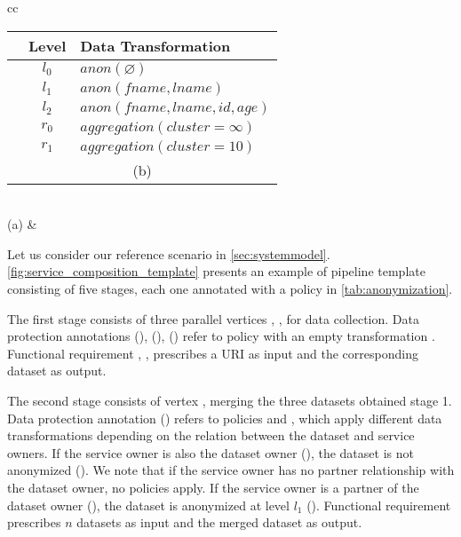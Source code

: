 \begin{table*}[ht!]
{\begin{tabular}[t]{cc}
      \begin{tabular}[t]{c|c|l}
        \textbf{\tp{i}} & \textbf{Level} & \textbf{Data Transformation}                      \\\hline
        \tp{0}          & $l_0$          & $anon(\varnothing)$                               \\
        \tp{1}          & $l_1$          & $anon(fname, lname)$                              \\
        \tp{2}          & $l_2$          & $anon(fname, lname, id, age)$                     \\
        \tp{3}          & $r_0$          & $aggregation(cluster=\infty)                    $ \\
        \tp{4}          & $r_1$          & $aggregation(cluster=10)                       $  \\
        \multicolumn{3}{c}{\footnotesize (b)}
      \end{tabular} \\
      \footnotesize (a) &                                                                                          \\
    \end{tabular}
  }
\end{table*}
Let us consider our reference scenario in \cref{sec:systemmodel}. \cref{fig:service_composition_template} presents an example of pipeline template consisting of five stages, each one annotated with a policy in \cref{tab:anonymization}.

The first stage consists of three parallel vertices , ,  for data collection.
Data protection annotations \myLambda(), \myLambda(), \myLambda() refer to policy  with an empty transformation .
Functional requirement , ,   prescribes a URI as input and the corresponding dataset as output.

The second stage consists of vertex ,
merging the three datasets obtained stage 1. Data protection annotation \myLambda() refers to policies  and , which apply different data transformations depending on the relation between the dataset and service owners.
If the service owner is also the dataset owner (\pone), the dataset is not anonymized (). We note that if the service owner has no partner relationship with the dataset owner, no policies apply.
If the service owner is a partner of the dataset owner (\ptwo), the dataset is anonymized at level $l_1$ ().
Functional requirement  prescribes $n$ datasets as input and the merged dataset as output.

